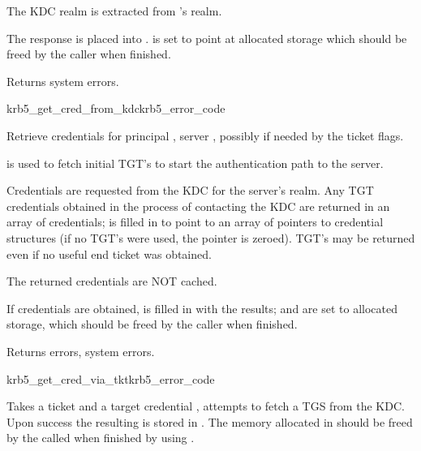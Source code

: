The KDC realm is extracted from 's realm.

The response is placed into .
 is set to point at allocated storage
which should be freed by the caller when finished.

Returns system errors.

\begin{funcdecl}{krb5_get_cred_from_kdc}{krb5_error_code}{\funcinout}
\funcin
{}
\funcout                        
{}
\end{funcdecl}


Retrieve credentials for principal ,
server , possibly
 if needed by the ticket flags.

 is used to fetch initial TGT's to start the authentication
path to the server.

Credentials are requested from the KDC for the server's realm.  Any
TGT credentials obtained in the process of contacting the KDC are
returned in an array of credentials;  is filled in to
point to an array of pointers to credential structures (if no TGT's were
used, the pointer is zeroed).  TGT's may be returned even if no useful
end ticket was obtained.

The returned credentials are NOT cached.

If credentials are obtained,  is filled in with the results;
 and
 are set to allocated storage,
which should be freed by the caller when finished.

Returns errors, system errors.

\begin{funcdecl}{krb5_get_cred_via_tkt}{krb5_error_code}{\funcinout}
\funcin
{}
\funcout
{}
\end{funcdecl}

Takes a ticket  and a target credential
, attempts to fetch a TGS from the KDC. Upon
success the resulting is stored in . The memory
allocated in  should be freed by the called when
finished by using . 


